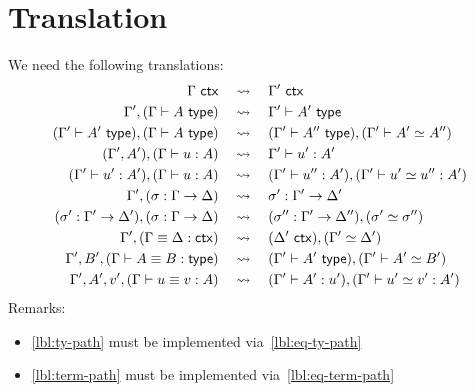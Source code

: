 
\section{Translation}
\label{sec:translation}

We need the following translations:
%
\begin{align}
  \label{lbl:ctx-ctr}
  \Gamma\ \mathsf{ctx}
  &\quad\leadsto\quad
  \Gamma'\ \mathsf{ctx}
  \\
  \label{lbl:ty-ctr}
  \Gamma', (\Gamma \vdash A \ \mathsf{type})
  &\quad\leadsto\quad
  \Gamma' \vdash A' \ \mathsf{type}
  \\
  \label{lbl:ty-path}
  (\Gamma' \vdash A' \ \mathsf{type}), (\Gamma \vdash A \ \mathsf{type})
  &\quad\leadsto\quad
  (\Gamma' \vdash A'' \ \mathsf{type}), (\Gamma' \vdash A' \simeq A'')
  \\
  (\Gamma', A'), (\Gamma \vdash u : A)
  &\quad\leadsto\quad
  \Gamma' \vdash u' : A'
  \\
  \label{lbl:term-path}
  (\Gamma' \vdash u' : A'), (\Gamma \vdash u : A)
  &\quad\leadsto\quad
  (\Gamma' \vdash u'' : A'), (\Gamma' \vdash u' \simeq u'' : A')
  \\
  \Gamma', (\sigma : \Gamma \to \Delta)
  &\quad\leadsto\quad
  \sigma' : \Gamma' \to \Delta'
  \\
  (\sigma' : \Gamma' \to \Delta'), (\sigma : \Gamma \to \Delta)
  &\quad\leadsto\quad
  (\sigma'' : \Gamma' \to \Delta''), (\sigma' \simeq \sigma'')
  \\
  \label{lbl:eq-ctx-path}
  \Gamma', (\Gamma \equiv \Delta : \mathsf{ctx})
  &\quad\leadsto\quad
  (\Delta'\ \mathsf{ctx}), (\Gamma' \simeq \Delta')
  \\
  \label{lbl:eq-ty-path}
  \Gamma', B', (\Gamma \vdash A \equiv B : \mathsf{type})
  &\quad\leadsto\quad
  (\Gamma' \vdash A' \ \mathsf{type}), (\Gamma' \vdash A' \simeq B')
  \\
  \label{lbl:eq-term-path}
  \Gamma', A', v', (\Gamma \vdash u \equiv v : A)
  &\quad\leadsto\quad
  (\Gamma' \vdash A' : u'), (\Gamma' \vdash u' \simeq v' : A')
\end{align}
%
Remarks:
%
\begin{itemize}
\item \eqref{lbl:ty-path} must be implemented via~\eqref{lbl:eq-ty-path}
\item \eqref{lbl:term-path} must be implemented via~\eqref{lbl:eq-term-path}
\end{itemize}





